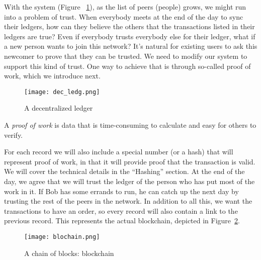 \documentclass[12pt,a4paper]{report}
\begin{document}
With the system (Figure ~\ref{fig:dec_ledg}), as the list of peers (people) grows, we 
might run into a problem of trust. When everybody meets at the end of 
the day to sync their ledgers, how can they believe the others that the 
transactions listed in their ledgers are true? Even if everybody trusts 
everybody else for their ledger, what if a new person wants to join this 
network? It’s natural for existing users to ask this newcomer to prove that 
they can be trusted. We need to modify our system to support this kind of 
trust. One way to achieve that is through so-called proof of work, which we 
introduce next.



\begin{figure}[H]
    \centering
    \texttt{[image: dec\_ledg.png]}
    \caption{A decentralized ledger}
    \label{fig:dec_ledg}
\end{figure}

\vspace{0.5em}


\vspace{0.5em}

\begin{tcolorbox}[colframe=black!75, colback=white, sharp corners, fonttitle=\bfseries, boxrule=0.5pt, title=\faInfoCircle\ Definition 1-5]
A \textit{proof of work} is data that is time-consuming to calculate and easy for others to verify.
\end{tcolorbox}

\vspace{0.5em}

For each record we will also include a special number (or a hash) 
that will represent proof of work, in that it will provide proof that the 
transaction is valid. We will cover the technical details in the “Hashing” 
section.
At the end of the day, we agree that we will trust the ledger of the 
person who has put most of the work in it. If Bob has some errands to 
run, he can catch up the next day by trusting the rest of the peers in the 
network.
In addition to all this, we want the transactions to have an order, so 
every record will also contain a link to the previous record. This represents 
the actual blockchain, depicted in Figure~\ref{fig:blockchain}.

\begin{figure}[H]
    \centering
    \texttt{[image: blochain.png]}
    \caption{A chain of blocks: blockchain}
    \label{fig:blockchain}
\end{figure}
\end{document}
